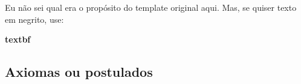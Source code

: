 %
%
%
%
%



\chapter[%
  \EngAndPor{Abbreviation for the Table of Contents}
  {Abreviação para o Sumário}
]{
}%
\label{cap_exemplos}

\sloppy
Eu não sei qual era o propósito do template original aqui. Mas, se
quiser texto em negrito, use:

\textbf{textbf}
\fussy

\section{Axiomas ou postulados}

